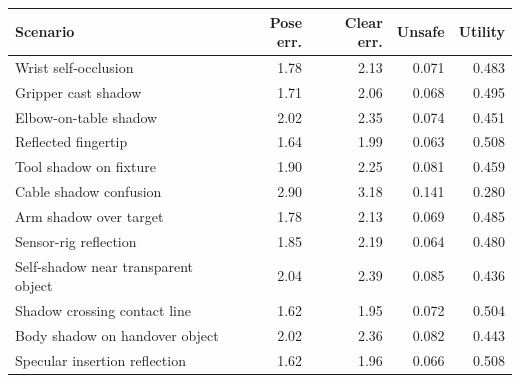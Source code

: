 \begin{tabular}{lrrrr}
\toprule
Scenario & Pose err. & Clear err. & Unsafe & Utility \\
\midrule
Wrist self-occlusion & 1.78 & 2.13 & 0.071 & 0.483 \\
Gripper cast shadow & 1.71 & 2.06 & 0.068 & 0.495 \\
Elbow-on-table shadow & 2.02 & 2.35 & 0.074 & 0.451 \\
Reflected fingertip & 1.64 & 1.99 & 0.063 & 0.508 \\
Tool shadow on fixture & 1.90 & 2.25 & 0.081 & 0.459 \\
Cable shadow confusion & 2.90 & 3.18 & 0.141 & 0.280 \\
Arm shadow over target & 1.78 & 2.13 & 0.069 & 0.485 \\
Sensor-rig reflection & 1.85 & 2.19 & 0.064 & 0.480 \\
Self-shadow near transparent object & 2.04 & 2.39 & 0.085 & 0.436 \\
Shadow crossing contact line & 1.62 & 1.95 & 0.072 & 0.504 \\
Body shadow on handover object & 2.02 & 2.36 & 0.082 & 0.443 \\
Specular insertion reflection & 1.62 & 1.96 & 0.066 & 0.508 \\
\bottomrule
\end{tabular}
